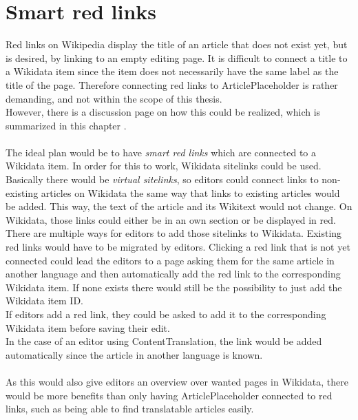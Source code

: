 \section{Smart red links}\label{sec:redLinks}
	Red links on Wikipedia display the title of an article that does not exist yet, but is desired, by linking to an empty editing page. It is difficult to connect a title to a Wikidata item since the item does not necessarily have the same label as the title of the page. Therefore connecting red links to ArticlePlaceholder is rather demanding, and not within the scope of this thesis. \\
	However, there is a discussion page on how this could be realized, which is summarized in this chapter \citep{wiki:22}. \\
	\\
	The ideal plan would be to have \textit{smart red links} which are connected to a Wikidata item. In order for this to work, Wikidata sitelinks could be used. Basically there would be \textit{virtual sitelinks}, so editors could connect links to non-existing articles on Wikidata the same way that links to existing articles would be added. This way, the text of the article and its Wikitext would not change. On Wikidata, those links could either be in an own section or be displayed in red. \\
	There are multiple ways for editors to add those sitelinks to Wikidata. Existing red links would have to be migrated by editors. Clicking a red link that is not yet connected could lead the editors to a page asking them for the same article in another language and then automatically add the red link to the corresponding Wikidata item. If none exists there would still be the possibility to just add the Wikidata item ID. \\
	If editors add a red link, they could be asked to add it to the corresponding Wikidata item before saving their edit. \\
	In the case of an editor using ContentTranslation, the link would be added automatically since the article in another language is known. \\
	\\
	As this would also give editors an overview over wanted pages in Wikidata, there would be more benefits than only having ArticlePlaceholder connected to red links, such as being able to find translatable articles easily.